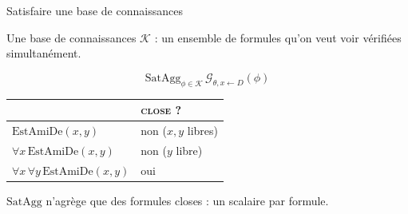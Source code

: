 \documentclass[aspectratio=169,10pt]{beamer}
\begin{document}
\begin{frame}{Satisfaire une base de connaissances}
  \begin{center}
    \small Une base de connaissances $\mathcal{K}$ : un ensemble de
    formules qu'on veut voir vérifiées simultanément.
  \end{center}

  \vspace{0.3em}
  \[
    \mathrm{SatAgg}_{\phi \in \mathcal{K}}\, \mathcal{G}_{\theta, x \leftarrow D}(\phi)
  \]

  \vspace{0.3em}
  \begin{center}
  \footnotesize
  \renewcommand{\arraystretch}{1.4}
  \begin{tabular}{@{} >{\raggedright\arraybackslash}p{4.8cm}
                       >{\centering\arraybackslash}p{2.2cm} @{}}
    \toprule
    {\color{ash}\scshape\footnotesize formule} &
    {\color{ash}\scshape\footnotesize close ?} \\
    \midrule
    $\text{EstAmiDe}(x,y)$ & non ($x,y$ libres) \\
    $\forall x\,\text{EstAmiDe}(x,y)$ & non ($y$ libre) \\
    $\forall x\,\forall y\,\text{EstAmiDe}(x,y)$ & oui \\
    \bottomrule
  \end{tabular}
  \end{center}

  \vspace{0.2em}
  \begin{center}
    \small $\mathrm{SatAgg}$ n'agrège que des formules
    \alert{closes} : un scalaire par formule.
  \end{center}
\end{frame}
\end{document}
